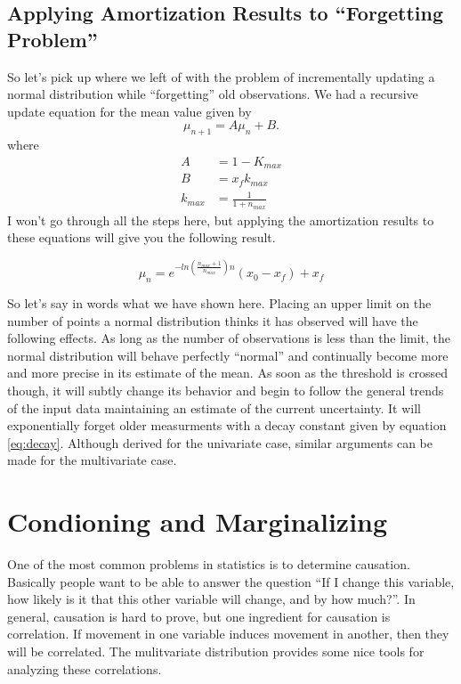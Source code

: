\documentclass[../../main.tex]{subfiles}
\begin{document}
\subsection{Applying Amortization Results to ``Forgetting Problem''}
So let's pick up where we left of with the problem of incrementally updating a
normal distribution while ``forgetting'' old observations.  We had a recursive
update equation for the mean value given by
\begin{equation}
    \mu_{n+1} = A \mu_n + B. \nonumber
\end{equation}
where
\begin{align}
    A &= 1 - K_{max} \nonumber\\
    B &= x_f k_{max} \nonumber\\
    k_{max} &= \frac{1}{1+n_{max}}
\end{align}
I won't go through all the steps here, but applying the amortization results
to these equations will give you the following result.

\begin{equation}
    \label{eq:expsolution}
    \mu_n = e^{-ln \left( \frac{n_{max} + 1}{n_{max}}  \right) n}
          \left( x_0 - x_f \right) + x_f
\end{equation}

So let's say in words what we have shown here.  Placing an upper limit on the
number of points a normal distribution thinks it has observed will have the
following effects.  As long as the number of observations is less than the
limit, the normal distribution will behave perfectly ``normal'' and
continually become more and more precise in its estimate of the mean.  As soon
as the threshold is crossed though, it will subtly change its behavior and
begin to follow the general trends of the input data maintaining an estimate
of the current uncertainty.  It will exponentially forget older measurments
with a decay constant given by equation \eqref{eq:decay}. Although derived for
the univariate case, similar arguments can be made for the multivariate case.
 
\section{Condioning and Marginalizing}
One of the most common problems in statistics is to determine causation.
Basically people want to be able to answer the question ``If I change this
variable, how likely is it that this other variable will change, and by how
much?''.  In general, causation is hard to prove, but one ingredient for
causation is correlation.  If movement in one variable induces movement in
another, then they will be correlated.  The mulitvariate distribution provides
some nice tools for analyzing these correlations.
\end{document}
